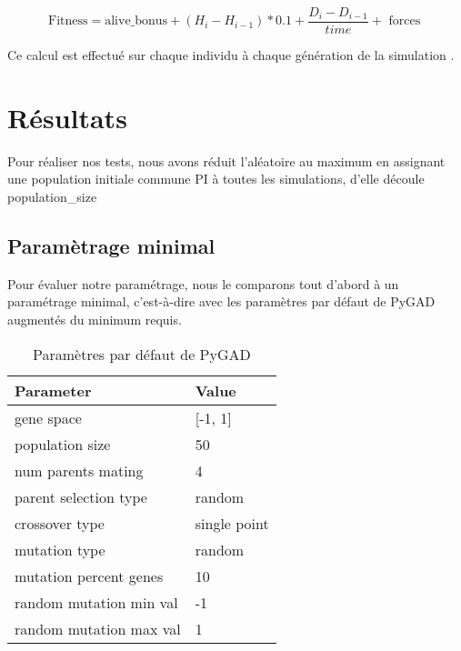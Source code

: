 \documentclass[journal, a4paper]{IEEEtran}
\begin{document}
		\begin{equation}\label{eq:equation}
			\text{{Fitness}} =
			\text{{alive\_bonus}}
			+ (H_{i} - H_{i-1}) * 0 .1
			+ \dfrac{D_{i} - {D_{i-1}}}{time}
			+ \text{{ forces }}
		\end{equation}

		Ce calcul est effectué sur chaque individu à chaque génération
		de la simulation . \\
\section{Résultats}\label{sec:resultats}
Pour réaliser nos tests, nous avons réduit l'aléatoire au maximum en
	 assignant une population initiale commune PI à toutes les
		simulations, d'elle découle population\_size
\subsection{Paramètrage minimal}\label{subsec:parametrage-minimal}
	Pour évaluer notre paramétrage, nous le comparons tout d'abord
	à un paramétrage minimal, c'est-à-dire avec les paramètres par
	défaut de PyGAD augmentés du minimum requis.
	\begin{table}[!hbt]
		\caption{Paramètres par défaut de PyGAD}
		\label{tab:PyGAD_parameters_default}
		\begin{tabular}{|l|l|}
			\hline
			\textbf{Parameter} & \textbf{Value} \\
			\hline
			gene space & [-1, 1] \\
			\hline
			population size & 50 \\
			\hline
			num parents mating & 4 \\
			\hline
			parent selection type & random \\
			\hline
			crossover type & single point \\
			\hline
			mutation type & random \\
			\hline
			mutation percent genes & 10 \\
			\hline
			random mutation min val & -1 \\
			\hline
			random mutation max val & 1 \\
			\hline
			\end{tabular}
	\end{table}
\end{document}
